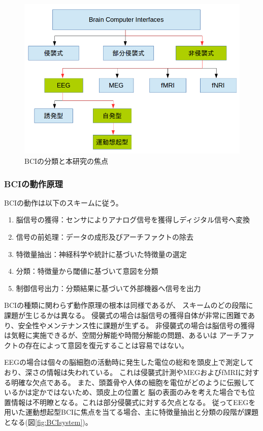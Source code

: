 \begin{figure}[tb]
    \centering
    \includegraphics[width=13cm]{images/BCIclass.png}
    \caption{BCIの分類と本研究の焦点}
    \label{fig:BCIclass}
\end{figure}

\subsubsection{\rm BCI\mc の動作原理}
BCIの動作は以下のスキームに従う。
\begin{enumerate}
    \item 脳信号の獲得：センサによりアナログ信号を獲得しディジタル信号へ変換
    \item 信号の前処理：データの成形及びアーチファクトの除去
    \item 特徴量抽出：神経科学や統計に基づいた特徴量の選定
    \item 分類：特徴量から閾値に基づいて意図を分類
    \item 制御信号出力：分類結果に基づいて外部機器へ信号を出力
\end{enumerate}
BCIの種類に関わらず動作原理の根本は同様であるが、
スキームのどの段階に課題が生じるかは異なる。
侵襲式の場合は脳信号の獲得自体が非常に困難であり、安全性やメンテナンス性に課題が生ずる。
非侵襲式の場合は脳信号の獲得は気軽に実施できるが、空間分解能や時間分解能の問題、あるいは
アーチファクトの存在によって意図を復元することは容易ではない。

EEGの場合は個々の脳細胞の活動時に発生した電位の総和を頭皮上で測定しており、深さの情報は失われている。
これは侵襲式計測やMEGおよびfMRIに対する明確な欠点である。
また、頭蓋骨や人体の細胞を電位がどのように伝搬しているかは定かではないため、頭皮上の位置と
脳の表面のみを考えた場合でも位置情報は不明瞭となる。これは部分侵襲式に対する欠点となる。
従ってEEGを用いた運動想起型BCIに焦点を当てる場合、主に特徴量抽出と分類の段階が課題となる(図\ref{fig:BCIsystem})。


